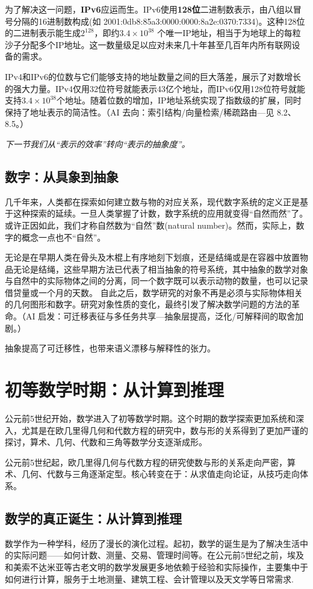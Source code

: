    为了解决这一问题，{\bf IPv6}应运而生。IPv6使用{\bf 128位}二进制数表示，由八组以冒号分隔的16进制数构成(如 2001:0db8:85a3:0000:0000:8a2e:0370:7334)。这种128位的二进制表示能生成$2^{128}$，即约{\bf $3.4 \times 10^{38} $} 个唯一IP地址，相当于为地球上的每粒沙子分配多个IP地址。这一数量级足以应对未来几十年甚至几百年内所有联网设备的需求。
   
IPv4和IPv6的位数与它们能够支持的地址数量之间的巨大落差，展示了对数增长的强大力量。IPv4仅用32位符号就能表示43亿个地址，而IPv6仅用128位符号就能支持{\bf $3.4 \times 10^{38}$}个地址。随着位数的增加，IP地址系统实现了指数级的扩展，同时保持了地址表示的简洁性。{（AI 去向：索引结构/向量检索/稀疏路由—见 8.2、8.5。）}

\emph{下一节我们从“表示的效率”转向“表示的抽象度”。}

\subsection{数字：从具象到抽象}
几千年来，人类都在探索如何建立数与物的对应关系，现代数字系统的定义正是基于这种探索的延续。一旦人类掌握了计数，数字系统的应用就变得“自然而然”了。或许正因如此，我们才称自然数为“自然”数(natural number)。然而，实际上，数字的概念一点也不“自然”。

无论是在早期人类在骨头及木棍上有序地刻下划痕，还是结绳或是在容器中放置物品无论是结绳，这些早期方法已代表了相当抽象的符号系统，其中抽象的数学对象与自然中的实际物体之间的分离，同一个数字既可以表示动物的数量，也可以记录借贷量或一个月的天数。
自此之后，数学研究的对象不再是必须与实际物体相关的几何图形和数字。研究对象性质的变化，最终引发了解决数学问题的方法的革命。{（AI 启发：可迁移表征与多任务共享—抽象层提高，泛化/可解释间的取舍加剧。）}

抽象提高了可迁移性，也带来语义漂移与解释性的张力。

\section{初等数学时期：从计算到推理}
公元前5世纪开始，数学进入了初等数学时期。这个时期的数学探索更加系统和深入，尤其是在欧几里得几何和代数方程的研究中，数与形的关系得到了更加严谨的探讨，算术、几何、代数和三角等数学分支逐渐成形。

公元前5世纪起，欧几里得几何与代数方程的研究使数与形的关系走向严密，算术、几何、代数与三角逐渐定型。核心转变在于：从求值走向论证，从技巧走向体系。

\subsection{数学的真正诞生：从计算到推理}
数学作为一种学科，经历了漫长的演化过程。起初，数学的诞生是为了解决生活中的实际问题——如何计数、测量、交易、管理时间等。在公元前5世纪之前，埃及和美索不达米亚等古老文明的数学发展更多地依赖于经验和实际操作，主要集中于如何进行计算，服务于土地测量、建筑工程、会计管理以及天文学等日常需求.

